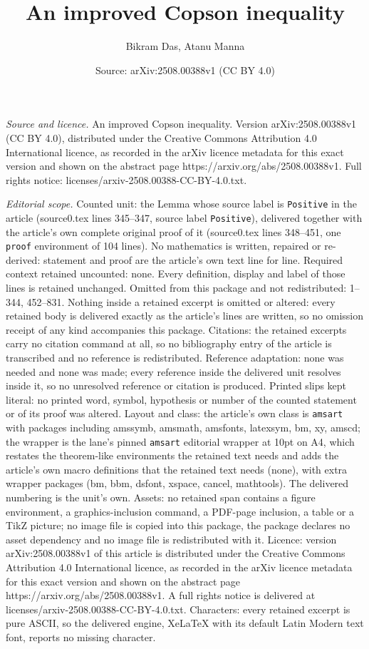\documentclass[10pt,a4paper]{amsart}
\title[An improved Copson inequality]{An improved Copson inequality}
\author{Bikram Das, Atanu Manna}
\date{Source: arXiv:2508.00388v1 (CC BY 4.0)}
\begin{document}
\maketitle

\noindent\emph{Source and licence.} An improved Copson inequality. Version arXiv:2508.00388v1 (CC BY 4.0), distributed under the Creative Commons Attribution 4.0 International licence, as recorded in the arXiv licence metadata for this exact version and shown on the abstract page https://arxiv.org/abs/2508.00388v1. Full rights notice: licenses/arxiv-2508.00388-CC-BY-4.0.txt.\par\smallskip

\noindent\textit{Editorial scope.} Counted unit: the Lemma whose source label is \texttt{Positive} in the article (source0.tex lines 345--347, source label \texttt{Positive}), delivered together with the article's own complete original proof of it (source0.tex lines 348--451, one \texttt{proof} environment of 104 lines). No mathematics is written, repaired or re-derived: statement and proof are the article's own text line for line. Required context retained uncounted: none. Every definition, display and label of those lines is retained unchanged. Omitted from this package and not redistributed: 1--344, 452--831. Nothing inside a retained excerpt is omitted or altered: every retained body is delivered exactly as the article's lines are written, so no omission receipt of any kind accompanies this package. Citations: the retained excerpts carry no citation command at all, so no bibliography entry of the article is transcribed and no reference is redistributed. Reference adaptation: none was needed and none was made; every reference inside the delivered unit resolves inside it, so no unresolved reference or citation is produced. Printed slips kept literal: no printed word, symbol, hypothesis or number of the counted statement or of its proof was altered. Layout and class: the article's own class is \texttt{amsart} with packages including amssymb, amsmath, amsfonts, latexsym, bm, xy, amscd; the wrapper is the lane's pinned \texttt{amsart} editorial wrapper at 10pt on A4, which restates the theorem-like environments the retained text needs and adds the article's own macro definitions that the retained text needs (none), with extra wrapper packages (bm, bbm, dsfont, xspace, cancel, mathtools). The delivered numbering is the unit's own. Assets: no retained span contains a figure environment, a graphics-inclusion command, a PDF-page inclusion, a table or a TikZ picture; no image file is copied into this package, the package declares no asset dependency and no image file is redistributed with it. Licence: version arXiv:2508.00388v1 of this article is distributed under the Creative Commons Attribution 4.0 International licence, as recorded in the arXiv licence metadata for this exact version and shown on the abstract page https://arxiv.org/abs/2508.00388v1. A full rights notice is delivered at licenses/arxiv-2508.00388-CC-BY-4.0.txt. Characters: every retained excerpt is pure ASCII, so the delivered engine, XeLaTeX with its default Latin Modern text font, reports no missing character.
\end{document}
